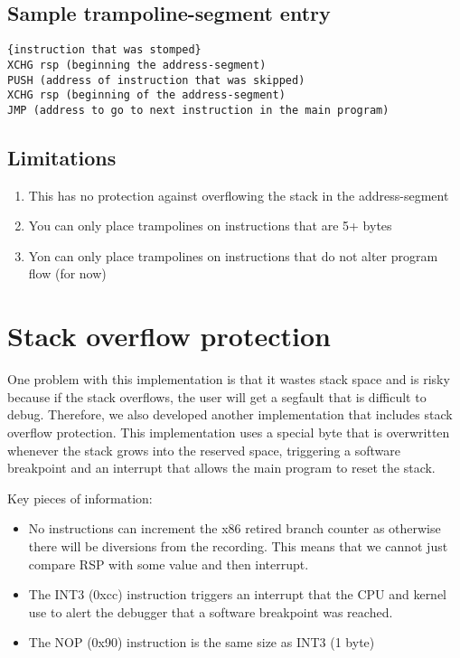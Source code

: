 \subsection{Sample trampoline-segment entry}
\begin{verbatim}
{instruction that was stomped}
XCHG rsp (beginning the address-segment)
PUSH (address of instruction that was skipped)
XCHG rsp (beginning of the address-segment)
JMP (address to go to next instruction in the main program)
\end{verbatim}

\subsection{Limitations}
\begin{enumerate}
    \item This has no protection against overflowing the stack in the address-segment
    \item You can only place trampolines on instructions that are 5+ bytes 
    \item Yon can only place trampolines on instructions that do not alter program flow (for now)
\end{enumerate}


\section{Stack overflow protection}
One problem with this implementation is that it wastes stack space and is risky because if the stack overflows, the user will get a segfault that is difficult to debug. Therefore, we also developed another implementation that includes stack overflow protection. This implementation uses a special byte that is overwritten whenever the stack grows into the reserved space, triggering a software breakpoint and an interrupt that allows the main program to reset the stack.

\noindent Key pieces of information:
\begin{itemize}
    \item No instructions can increment the x86 retired branch counter as otherwise there will be diversions from the recording. This means that we cannot just compare RSP with some value and then interrupt. 
    \item The INT3 (0xcc) instruction triggers an interrupt that the CPU and kernel use to alert the debugger that a software breakpoint was reached.
    \item The NOP (0x90) instruction is the same size as INT3 (1 byte) 
\end{itemize}

